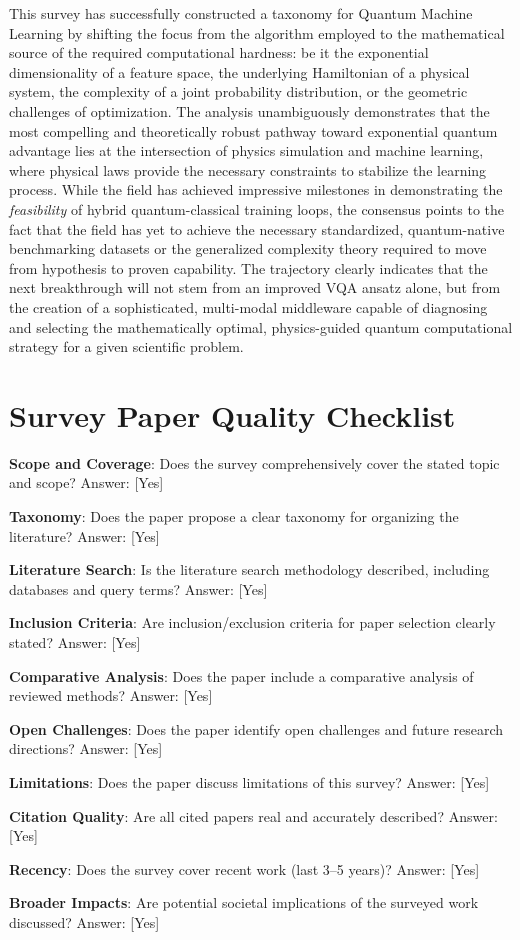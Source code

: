 \documentclass{article}
\begin{document}
\label{sec:conclusion}

This survey has successfully constructed a taxonomy for Quantum Machine Learning by shifting the focus from the algorithm employed to the mathematical source of the required computational hardness: be it the exponential dimensionality of a feature space, the underlying Hamiltonian of a physical system, the complexity of a joint probability distribution, or the geometric challenges of optimization. The analysis unambiguously demonstrates that the most compelling and theoretically robust pathway toward exponential quantum advantage lies at the intersection of physics simulation and machine learning, where physical laws provide the necessary constraints to stabilize the learning process. While the field has achieved impressive milestones in demonstrating the \textit{feasibility} of hybrid quantum-classical training loops, the consensus points to the fact that the field has yet to achieve the necessary standardized, quantum-native benchmarking datasets or the generalized complexity theory required to move from hypothesis to proven capability. The trajectory clearly indicates that the next breakthrough will not stem from an improved VQA ansatz alone, but from the creation of a sophisticated, multi-modal middleware capable of diagnosing and selecting the mathematically optimal, physics-guided quantum computational strategy for a given scientific problem.

\section{Survey Paper Quality Checklist}

\label{sec:survey\_paper\_quality\_checklist}

\textbf{Scope and Coverage}: Does the survey comprehensively cover the stated topic and scope?
Answer: [Yes]

\textbf{Taxonomy}: Does the paper propose a clear taxonomy for organizing the literature?
Answer: [Yes]

\textbf{Literature Search}: Is the literature search methodology described, including databases and query terms?
Answer: [Yes]

\textbf{Inclusion Criteria}: Are inclusion/exclusion criteria for paper selection clearly stated?
Answer: [Yes]

\textbf{Comparative Analysis}: Does the paper include a comparative analysis of reviewed methods?
Answer: [Yes]

\textbf{Open Challenges}: Does the paper identify open challenges and future research directions?
Answer: [Yes]

\textbf{Limitations}: Does the paper discuss limitations of this survey?
Answer: [Yes]

\textbf{Citation Quality}: Are all cited papers real and accurately described?
Answer: [Yes]

\textbf{Recency}: Does the survey cover recent work (last 3--5 years)?
Answer: [Yes]

\textbf{Broader Impacts}: Are potential societal implications of the surveyed work discussed?
Answer: [Yes]



\end{document}
